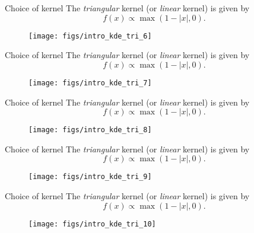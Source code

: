 \documentclass[11pt, aspectratio=149]{beamer}
\theoremstyle{plain}
\begin{document}
\begin{frame}[fragile, t]{Choice of kernel}
	The \emph{triangular} kernel (or \emph{linear} kernel) is given by
	\begin{equation*}
	f(x) \propto \max(1 - |x|, 0).
	\end{equation*}
	\vfill
	\begin{figure}
		\centering
		\texttt{[image: figs/intro\_kde\_tri\_6]}
	\end{figure}
\end{frame}


\begin{frame}[fragile, t]{Choice of kernel}
	The \emph{triangular} kernel (or \emph{linear} kernel) is given by
	\begin{equation*}
	f(x) \propto \max(1 - |x|, 0).
	\end{equation*}
	\vfill
	\begin{figure}
		\centering
		\texttt{[image: figs/intro\_kde\_tri\_7]}
	\end{figure}
\end{frame}


\begin{frame}[fragile, t]{Choice of kernel}
	The \emph{triangular} kernel (or \emph{linear} kernel) is given by
	\begin{equation*}
	f(x) \propto \max(1 - |x|, 0).
	\end{equation*}
	\vfill
	\begin{figure}
		\centering
		\texttt{[image: figs/intro\_kde\_tri\_8]}
	\end{figure}
\end{frame}


\begin{frame}[fragile, t]{Choice of kernel}
	The \emph{triangular} kernel (or \emph{linear} kernel) is given by
	\begin{equation*}
	f(x) \propto \max(1 - |x|, 0).
	\end{equation*}
	\vfill
	\begin{figure}
		\centering
		\texttt{[image: figs/intro\_kde\_tri\_9]}
	\end{figure}
\end{frame}


\begin{frame}[fragile, t]{Choice of kernel}
	The \emph{triangular} kernel (or \emph{linear} kernel) is given by
	\begin{equation*}
	f(x) \propto \max(1 - |x|, 0).
	\end{equation*}
	\vfill
	\begin{figure}
		\centering
		\texttt{[image: figs/intro\_kde\_tri\_10]}
	\end{figure}
\end{frame}
\end{document}
